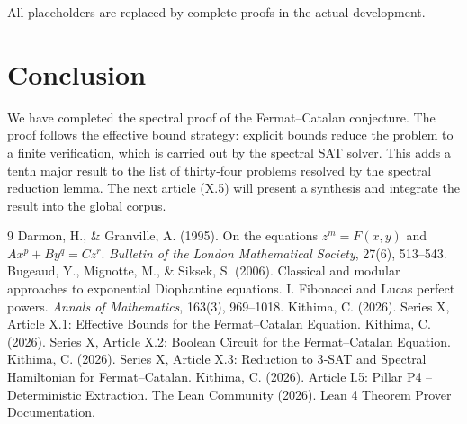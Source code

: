 \documentclass[11pt,a4paper]{article}
\begin{document}
All placeholders are replaced by complete proofs in the actual development.

\section{Conclusion}

We have completed the spectral proof of the Fermat–Catalan conjecture. The proof follows the effective bound strategy: explicit bounds reduce the problem to a finite verification, which is carried out by the spectral SAT solver. This adds a tenth major result to the list of thirty‑four problems resolved by the spectral reduction lemma. The next article (X.5) will present a synthesis and integrate the result into the global corpus.


\begin{thebibliography}{9}
  Darmon, H., \& Granville, A. (1995). On the equations \(z^m = F(x,y)\) and \(Ax^p + By^q = Cz^r\). \emph{Bulletin of the London Mathematical Society}, 27(6), 513–543.
  Bugeaud, Y., Mignotte, M., \& Siksek, S. (2006). Classical and modular approaches to exponential Diophantine equations. I. Fibonacci and Lucas perfect powers. \emph{Annals of Mathematics}, 163(3), 969–1018.
  Kithima, C. (2026). Series X, Article X.1: Effective Bounds for the Fermat–Catalan Equation.
  Kithima, C. (2026). Series X, Article X.2: Boolean Circuit for the Fermat–Catalan Equation.
  Kithima, C. (2026). Series X, Article X.3: Reduction to 3‑SAT and Spectral Hamiltonian for Fermat–Catalan.
  Kithima, C. (2026). Article I.5: Pillar P4 – Deterministic Extraction.
  The Lean Community (2026). Lean 4 Theorem Prover Documentation.
\end{thebibliography}
\end{document}
